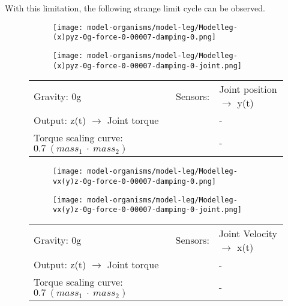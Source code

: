 \documentclass[main]{subfiles}
\begin{document}
With this limitation, the following strange limit cycle can be observed.

\begin{figure}[H]
	\centering
		\begin{subfigure}[c]{0.45\textwidth}
	\texttt{[image: model-organisms/model-leg/Modelleg-(x)pyz-0g-force-0-00007-damping-0.png]}
		\end{subfigure}
	\begin{subfigure}[c]{0.45\textwidth}
	\texttt{[image: model-organisms/model-leg/Modelleg-(x)pyz-0g-force-0-00007-damping-0-joint.png]}
		\end{subfigure}
	\caption[Limited chaotic controller controlling model leg]{}
	\begin{tabular}{l|ll}
	\hline 
	Gravity: 0g  & Sensors: & Joint position \(\rightarrow\) y(t)\\
	 Output: z(t) \(\rightarrow\) Joint torque & & - \\
	  Torque scaling curve: \(0.7~(mass_1~\cdot~mass_2)\) & & - \\
	  \hline
	\end{tabular}

	\label{figure:limited-model-leg2}
\end{figure}

\begin{figure}[H]
	\centering
		\begin{subfigure}[c]{0.45\textwidth}
	\texttt{[image: model-organisms/model-leg/Modelleg-vx(y)z-0g-force-0-00007-damping-0.png]}
		\end{subfigure}
	\begin{subfigure}[c]{0.45\textwidth}
	\texttt{[image: model-organisms/model-leg/Modelleg-vx(y)z-0g-force-0-00007-damping-0-joint.png]}
		\end{subfigure}
	\caption[Limited chaotic controller controlling model leg]{}
	\begin{tabular}{l|ll}
	\hline 
	Gravity: 0g  & Sensors: & Joint Velocity \(\rightarrow\) x(t)\\
	 Output: z(t) \(\rightarrow\) Joint torque & & - \\
	  Torque scaling curve: \(0.7~(mass_1~\cdot~mass_2)\) & & - \\
	  \hline
	\end{tabular}
	\label{figure:limited-model-leg3}
\end{figure}
\end{document}
